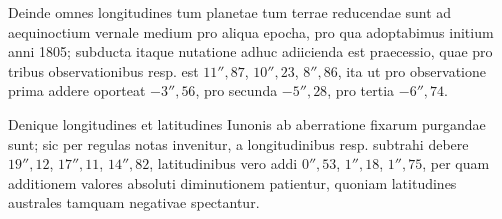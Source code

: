 Deinde omnes longitudines tum planetae tum terrae reducendae sunt ad
aequinoctium vernale medium pro aliqua epocha, pro qua adoptabimus initium
anni 1805; subducta itaque nutatione adhuc adiicienda est praecessio, quae
pro tribus observationibus resp. est $11''{,}87$, $10''{,}23$, $8''{,}86$, ita ut pro observatione
prima addere oporteat $-3''{,}56$, pro secunda $-5''{,}28$, pro tertia $-6''{,}74$.

Denique longitudines et latitudines Iunonis ab aberratione fixarum purgandae
sunt; sic per regulas notas invenitur, a longitudinibus resp. subtrahi
debere $19''{,}12$, $17''{,}11$, $14''{,}82$, latitudinibus vero addi $0''{,}53$, $1''{,}18$, $1''{,}75$, per quam
additionem valores absoluti diminutionem patientur, quoniam latitudines australes
tamquam negativae spectantur.
